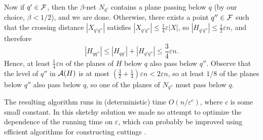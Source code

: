 \documentclass[12pt]{article}
\newcommand{\eps}{{\varepsilon}}
\def\A{{\cal A}}
\def\F{{\cal F}}
\begin{document}
Now if $q'\in\F$, then the $\beta$-net $N_{q'}$ contains a plane
passing below $q$ (by our choice, $\beta<1/2$), and we are done.
Otherwise, there exists a point $q''\in\F$ such that the crossing
distance $|X_{q'q''}|$ satisfies $|X_{q'q''}| \le \frac14\eps|X|$,
so $|H_{q'q''}| \le \frac12\eps n$, and therefore
$$
|H_{qq''}| \le |H_{qq'}| + |H_{q'q''}| \le \frac34\eps n .
$$
Hence, at least $\frac14\eps n$ of the planes of $H$ below $q$ also
pass below $q''$. Observe that the level of $q''$ in $\A(H)$ is at
most $(\frac32+\frac14)\eps n < 2\eps n$, so
at least $1/8$ of the planes below $q''$ also
pass below $q$, so one of the planes of $N_{q''}$ must pass below $q$.

The resulting algorithm runs in (deterministic) time
$O(n/\eps^{c})$, where $c$ is some small constant. In this sketchy
solution we made no attempt to optimize the dependence of the running
time on $\eps$, which can probably be improved using
efficient algorithms for constructing cuttings \cite{m-ept-92}.


\providecommand{\CNFX}[1]{ {\em{\textrm{(#1)}}}}
  \providecommand{\CNFSoCG}{\CNFX{SoCG}}  
\end{document}
